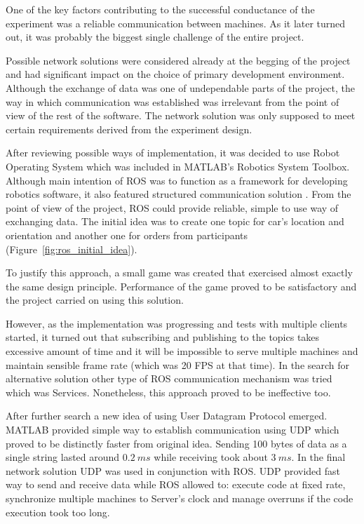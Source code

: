 \documentclass[11pt,english]{article}
\begin{document}
One of the key factors contributing to the successful conductance of the experiment was a reliable communication between machines. As it later turned out, it was probably the biggest single challenge of the entire project.
\par
Possible network solutions were considered already at the begging of the project and had significant impact on the choice of primary development environment. Although the exchange of data was one of undependable parts of the project, the way in which communication was established was irrelevant from the point of view of the rest of the software. The network solution was only supposed to meet certain requirements derived from the experiment design.
\par
 After reviewing possible ways of implementation, it was decided to use Robot Operating System which was included in MATLAB's Robotics System Toolbox. Although main intention of ROS was to function as a framework for developing robotics software, it also featured  structured communication solution \citep{quigley2009ros}. From the point of view of the project, ROS could provide reliable, simple to use way of exchanging data. The initial idea was to create one topic for car's location and orientation and another one for orders from participants (Figure~\ref{fig:ros_initial_idea}). 
\par
To justify this approach, a small game was created that exercised almost exactly the same design principle. Performance of the game proved to be satisfactory and the project carried on using this solution. 
\par
However, as the implementation was progressing and tests with multiple clients started, it turned out that subscribing and publishing to the topics takes excessive amount of time and it will be impossible to serve multiple machines and maintain sensible frame rate (which was 20 FPS at that time). In the search for alternative solution other type of ROS communication mechanism was tried which was Services. Nonetheless, this approach proved to be ineffective too. 
\par
After further search a new idea of using User Datagram Protocol emerged. MATLAB provided simple way to establish communication using UDP which proved to be distinctly faster from original idea. Sending 100 bytes of data as a single string lasted around $0.2\:ms$ while receiving took about $3\:ms$. 
In the final network solution UDP was used in conjunction with ROS. UDP provided fast way to send and receive data while ROS allowed to: execute code at fixed rate, synchronize multiple machines to Server's clock and manage overruns if the code execution took too long. 
\end{document}
